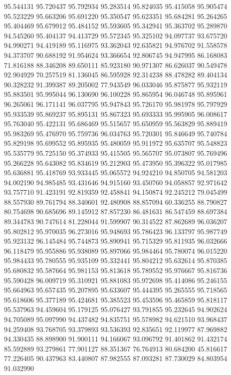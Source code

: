 95.544131
95.720437
95.792934
95.283514
95.824035
95.415058
95.905474
95.523229
95.663206
95.691220
95.350547
95.623351
95.684281
95.264265
95.404469
95.679912
95.484152
95.593605
95.342941
95.363702
95.289870
94.545260
95.404137
94.413729
95.572345
95.325102
94.097737
93.675720
94.990271
94.419189
95.116975
93.362043
92.635821
94.976702
91.558578
94.373707
90.688192
91.954624
93.366654
92.806745
94.947995
86.168083
71.816188
88.346208
89.650111
85.923180
90.971307
86.626037
90.549478
92.904929
70.257519
81.136045
86.595928
92.314238
88.478282
89.404134
90.328232
91.399387
89.205002
77.943549
96.033046
95.875877
95.932119
95.883501
95.995044
96.130690
96.100228
95.865954
96.046748
95.895961
96.265061
96.171141
96.037795
95.947843
95.726170
95.981978
95.797929
95.933539
95.869237
95.895131
95.867323
95.693333
95.995905
96.008617
95.763040
95.422131
95.686469
95.515657
95.650959
95.563829
95.889419
95.983269
95.476970
95.759736
96.034763
95.720301
95.846649
95.740784
95.829198
95.699552
95.895935
95.480059
95.911972
95.635707
95.548823
95.535779
95.725150
95.374933
95.415505
95.565707
95.073807
95.769496
95.266228
95.643082
95.834619
95.212903
95.473950
95.396322
95.017985
95.636881
95.418769
93.933445
95.065572
94.924210
94.850705
94.581203
94.002190
94.985485
93.431646
94.915160
93.450760
94.058857
92.971642
93.757710
91.423191
92.819359
92.458841
94.150874
92.245212
79.045499
88.557930
89.761794
88.340601
92.480908
88.857094
60.336255
88.790827
80.754698
90.685696
89.145912
87.857230
86.481631
86.547459
88.697384
89.344783
90.747614
81.228044
91.599907
90.314522
87.862689
96.036207
95.802812
95.970035
96.273016
95.948693
95.786423
96.133797
95.987749
95.923132
96.145484
95.744873
95.890941
95.715329
95.811935
96.032666
96.118479
95.955886
95.938089
95.897066
95.984464
95.780074
96.015220
95.984433
95.780555
95.935109
95.332441
95.804212
95.632614
95.870385
95.680832
95.587664
95.981153
95.813618
95.789552
95.976667
95.816736
95.590428
96.009719
95.310921
95.881083
95.972698
95.414086
95.246155
95.664963
95.657435
95.207895
95.633607
95.444395
95.265555
95.718565
95.618606
95.377189
95.424681
95.385523
95.453596
95.465859
95.818117
95.537963
94.459604
95.179125
95.076427
93.791855
95.232645
94.902624
94.705089
95.097990
94.437482
94.835751
95.578982
94.621510
93.968437
94.259408
93.768705
93.379893
93.536393
92.835651
92.119977
87.969882
94.330435
88.898900
91.900111
94.166067
93.096792
91.401862
91.432174
85.592889
93.279861
77.901127
88.351367
76.764913
80.684200
45.816617
77.226405
90.437963
83.440807
87.982555
87.093281
87.730029
84.803954
91.032990
